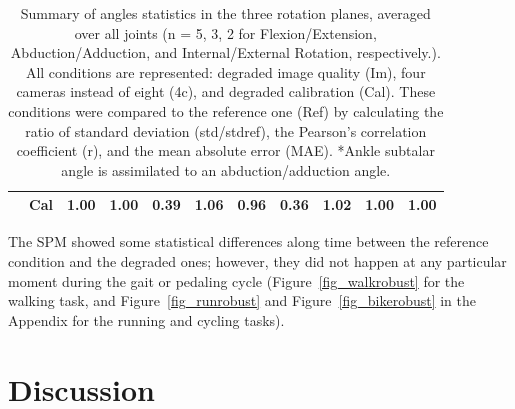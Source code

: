 \begin{table}[!ht]
{\begin{tabular}{lllllllllll}
                    &Cal&	1.00&	1.00&	0.39&	1.06&	0.96&	0.36&	1.02&	1.00&	1.00\\
          \bottomrule
      \end{tabular}}
      \caption{Summary of angles statistics in the three rotation planes, averaged over all joints (n = 5, 3, 2 for Flexion/Extension, Abduction/Adduction, and Internal/External Rotation, respectively.). All conditions are represented: degraded image quality (Im), four cameras instead of eight (4c), and degraded calibration (Cal). These conditions were compared to the reference one (Ref) by calculating the ratio of standard deviation (std/stdref), the Pearson’s correlation coefficient (r), and the mean absolute error (MAE). *Ankle subtalar angle is assimilated to an abduction/adduction angle.}
      \label{table:tab_statsperplane}
\end{table}

The SPM showed some statistical differences along time between the reference condition and the degraded ones; however, they did not happen at any particular moment during the gait or pedaling cycle (Figure~\ref{fig_walkrobust} for the walking task, and Figure~\ref{fig_runrobust} and Figure~\ref{fig_bikerobust} in the Appendix for the running and cycling tasks).\newline

\section{Discussion}




